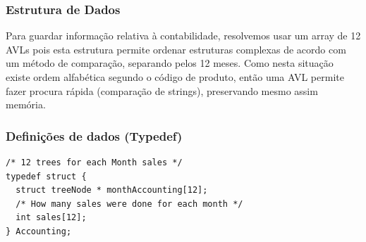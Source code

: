 \documentclass[10pt] {article}
\begin{document}
\subsubsection{Estrutura de Dados}
\par
Para guardar informação relativa à contabilidade, resolvemos usar um array de 12 AVLs pois esta estrutura permite ordenar estruturas complexas de acordo com um método de comparação, separando pelos 12 meses. Como nesta situação existe ordem alfabética segundo o código de produto, então uma AVL permite fazer procura rápida (comparação de strings), preservando mesmo assim memória. 

\subsubsection{Definições de dados (Typedef)}


\begin{lstlisting}
/* 12 trees for each Month sales */
typedef struct {
  struct treeNode * monthAccounting[12];
  /* How many sales were done for each month */
  int sales[12];
} Accounting;
\end{lstlisting}
\end{document}
